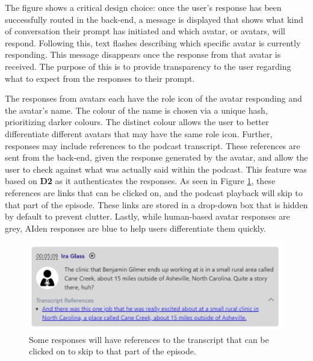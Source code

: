 \documentclass[12pt]{report}
\begin{document}
\begin{myfont}
        \indent The figure shows a critical design choice: once the user's response has been successfully routed in the back-end, a message is displayed that shows what kind of conversation their prompt has initiated and which avatar, or avatars, will respond. Following this, text flashes describing which specific avatar is currently responding. This message disappears once the response from that avatar is received. The purpose of this is to provide transparency to the user regarding what to expect from the responses to their prompt. 
        
        \indent The responses from avatars each have the role icon of the avatar responding and the avatar's name. The colour of the name is chosen via a unique hash, prioritizing darker colours. The distinct colour allows the user to better differentiate different avatars that may have the same role icon. Further, responses may include references to the podcast transcript. These references are sent from the back-end, given the response generated by the avatar, and allow the user to check against what was actually said within the podcast. This feature was based on \textbf{D2} as it authenticates the responses. As seen in Figure \ref{fig:transcriptreferences}, these references are links that can be clicked on, and the podcast playback will skip to that part of the episode. These links are stored in a drop-down box that is hidden by default to prevent clutter. Lastly, while human-based avatar responses are grey, AIden responses are blue to help users differentiate them quickly. 

        \begin{figure}[H]
                \includegraphics[width=1\textwidth]{figures/transcriptreferences.png}
              \caption{Some responses will have references to the transcript that can be clicked on to skip to that part of the episode.}
              \label{fig:transcriptreferences}
        \end{figure}


\end{myfont}
\end{document}
